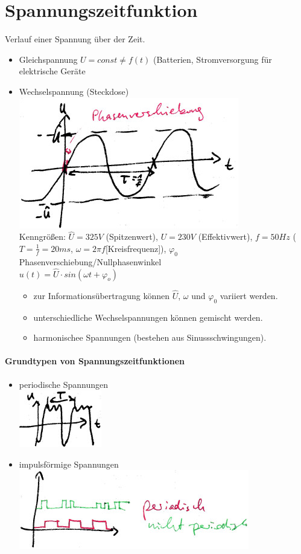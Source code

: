 \section{Spannungszeitfunktion}
Verlauf einer Spannung über der Zeit.
\begin{itemize}
\item Gleichspannung $U= const \not = f(t)$ (Batterien, Stromversorgung für elektrische Geräte
\item Wechselspannung (Steckdose)\\
\includegraphics[scale=.75]{Abbildungen/ABB403}\\
Kenngrößen: $\hat{U}=325V$ (Spitzenwert), $U=230V$ (Effektivwert), $f=50Hz$ ($T=\frac{1}{f}=20ms$, $\omega = 2 \pi f$[Kreisfrequenz]), $\varphi_0$ Phasenverschiebung/Nullphasenwinkel\\
$u(t)=\hat{U}\cdot sin(\omega t+\varphi_o)$
\begin{itemize}
\item zur Informationsübertragung können $\hat{U}$, $\omega$ und $\varphi_0$ variiert werden.
\item unterschiedliche Wechselspannungen können gemischt werden.
\item harmonischee Spannungen (bestehen aus Sinussschwingungen).
\end{itemize}
\end{itemize}

\paragraph{Grundtypen von Spannungszeitfunktionen}
\begin{itemize}
\item periodische Spannungen\\
\includegraphics[scale=.75]{Abbildungen/ABB404}
\item impulsförmige Spannungen\\
\includegraphics[scale=.75]{Abbildungen/ABB405}
\end{itemize}

